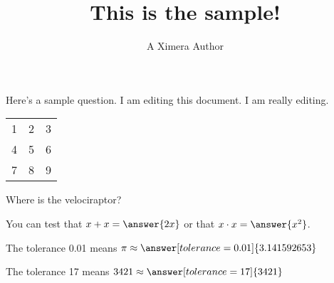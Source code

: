 \documentclass[handout]{ximera}
\title{This is the sample!}
\author{A Ximera Author}
\begin{document}
\maketitle

Here's a sample question.  I am editing this document.  I am really editing.

\begin{tabular}{ | l | c | r | }
  1 & 2 & 3 \\
  4 & 5 & 6 \\
  7 & 8 & 9 \\
\end{tabular}

\begin{problem} Where is the velociraptor?
\begin{multipleChoice}
\end{multipleChoice}
\end{problem}

\begin{problem}
\begin{selectAll}
\end{selectAll}
\end{problem}

\begin{problem}
   You can test that $x + x = \answer{2x}$ or that $x \cdot x = \answer{x^2}$.
\end{problem}

\begin{problem}
   The tolerance 0.01 means $\pi \approx \answer[tolerance=0.01]{3.141592653}$
\end{problem}

\begin{problem}
   The tolerance 17 means $3421 \approx \answer[tolerance=17]{3421}$
\end{problem}

\end{document}

